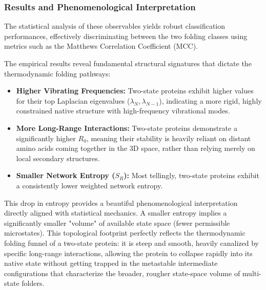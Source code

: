 \subsubsection{Results and Phenomenological Interpretation}
\label{subsubsec:folding_results}

The statistical analysis of these observables yields robust classification performances, effectively discriminating between the two folding classes using metrics such as the Matthews Correlation Coefficient (MCC).



The empirical results reveal fundamental structural signatures that dictate the thermodynamic folding pathways:
\begin{itemize}
    \item \textbf{Higher Vibrating Frequencies:} Two-state proteins exhibit higher values for their top Laplacian eigenvalues (\(\lambda_N, \lambda_{N-1}\)), indicating a more rigid, highly constrained native structure with high-frequency vibrational modes.
    \item \textbf{More Long-Range Interactions:} Two-state proteins demonstrate a significantly higher \(R_0\), meaning their stability is heavily reliant on distant amino acids coming together in the 3D space, rather than relying merely on local secondary structures.
    \item \textbf{Smaller Network Entropy (\(S_R\)):} Most tellingly, two-state proteins exhibit a consistently lower weighted network entropy.
\end{itemize}

This drop in entropy provides a beautiful phenomenological interpretation directly aligned with statistical mechanics. A smaller entropy implies a significantly smaller "volume" of available state space (fewer permissible microstates). This topological footprint perfectly reflects the thermodynamic folding funnel of a two-state protein: it is steep and smooth, heavily canalized by specific long-range interactions, allowing the protein to collapse rapidly into its native state without getting trapped in the metastable intermediate configurations that characterize the broader, rougher state-space volume of multi-state folders.